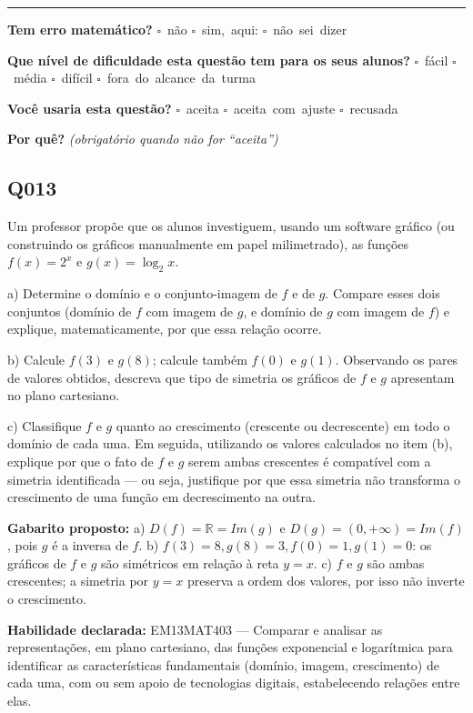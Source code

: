 \documentclass[11pt,a4paper]{article}
\begin{document}
\noindent\rule{\linewidth}{0.4pt}
\textbf{Tem erro matemático?}\quad
\mbox{$\square$~não} \quad \mbox{$\square$~sim, aqui:} \underline{\hspace{5cm}}
\quad \mbox{$\square$~não sei dizer}

\textbf{Que nível de dificuldade esta questão tem para os seus alunos?}\quad
\mbox{$\square$~fácil} \quad \mbox{$\square$~média} \quad
\mbox{$\square$~difícil} \quad \mbox{$\square$~fora do alcance da turma}

\textbf{Você usaria esta questão?}\quad
\mbox{$\square$~aceita} \quad \mbox{$\square$~aceita com ajuste} \quad
\mbox{$\square$~recusada}

\textbf{Por quê?} \emph{(obrigatório quando não for ``aceita'')}

\underline{\hspace{\linewidth}}

\underline{\hspace{\linewidth}}
\vspace{0.6em}

\begin{samepage}
\subsection*{Q013}
Um professor propõe que os alunos investiguem, usando um software gráfico (ou construindo os gráficos manualmente em papel milimetrado), as funções $f(x) = 2^x$ e $g(x) = \log_2 x$.

a) Determine o domínio e o conjunto-imagem de $f$ e de $g$. Compare esses dois conjuntos (domínio de $f$ com imagem de $g$, e domínio de $g$ com imagem de $f$) e explique, matematicamente, por que essa relação ocorre.

b) Calcule $f(3)$ e $g(8)$; calcule também $f(0)$ e $g(1)$. Observando os pares de valores obtidos, descreva que tipo de simetria os gráficos de $f$ e $g$ apresentam no plano cartesiano.

c) Classifique $f$ e $g$ quanto ao crescimento (crescente ou decrescente) em todo o domínio de cada uma. Em seguida, utilizando os valores calculados no item (b), explique por que o fato de $f$ e $g$ serem ambas crescentes é compatível com a simetria identificada — ou seja, justifique por que essa simetria não transforma o crescimento de uma função em decrescimento na outra.

\textbf{Gabarito proposto:} a) $D(f)=\mathbb{R}=Im(g)$ e $D(g)=(0,+\infty)=Im(f)$, pois $g$ é a inversa de $f$. b) $f(3)=8, g(8)=3, f(0)=1, g(1)=0$: os gráficos de $f$ e $g$ são simétricos em relação à reta $y=x$. c) $f$ e $g$ são ambas crescentes; a simetria por $y=x$ preserva a ordem dos valores, por isso não inverte o crescimento.

\textbf{Habilidade declarada:} EM13MAT403 --- Comparar e analisar as representações, em plano cartesiano, das funções exponencial e logarítmica para identificar as características fundamentais (domínio, imagem, crescimento) de cada uma, com ou sem apoio de tecnologias digitais, estabelecendo relações entre elas.
\end{samepage}
\end{document}

